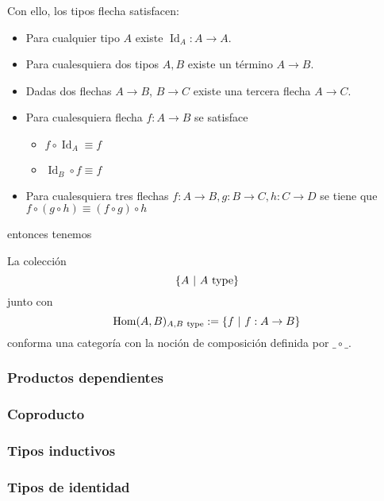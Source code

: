 \documentclass{article}
\DeclareMathOperator{\Id}{Id}
\begin{document}
    Con ello, los tipos flecha satisfacen:
    \begin{itemize}
        \item Para cualquier tipo $A$ existe $\Id_A : A \rightarrow A$.
        \item Para cualesquiera dos tipos $A, B$ existe un término $A \rightarrow B$.
        \item Dadas dos flechas $A \rightarrow B$, $B \rightarrow C$
        existe una tercera flecha $A \rightarrow C$.
        \item Para cualesquiera flecha $f : A \rightarrow B$ se satisface 
        \begin{itemize}
            \item $f \circ \Id_A \equiv f$
            \item $\Id_B \circ f \equiv f$
        \end{itemize}
        \item Para cualesquiera tres flechas $f : A \rightarrow B, g : B \rightarrow C, h : C \rightarrow D$
        se tiene que $f\circ (g\circ h) \equiv (f \circ g) \circ h$
    \end{itemize}
    
    entonces tenemos

    \begin{theorem}
        La colección
        $$
            \{A \ \vert\ A\ \type\}
        $$
        junto con
        $$
            \mathrm{Hom}(A, B)_{A, B\ \mathrm{type}} := \{f \ \vert\ f : A \rightarrow B\}
        $$
        conforma una categoría con la noción de composición definida por $\_\circ\_$.
    \end{theorem}
    \subsubsection{Productos dependientes}
    \subsubsection{Coproducto}
    \subsubsection{Tipos inductivos}
    
    \subsubsection{Tipos de identidad}
\end{document}
